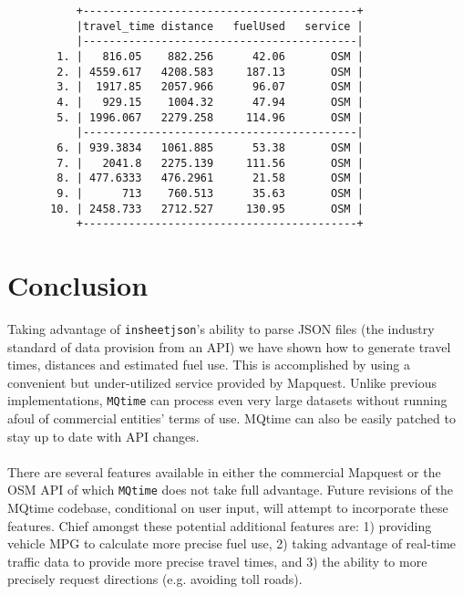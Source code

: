 \documentclass[12pt]{article}
\begin{document}
\begin{figure}[ht]
\begin{center}
{\footnotesize
\begin{verbatim}
     +------------------------------------------+
     |travel_time distance   fuelUsed   service |
     |------------------------------------------|
  1. |   816.05    882.256      42.06       OSM |
  2. | 4559.617   4208.583     187.13       OSM |
  3. |  1917.85   2057.966      96.07       OSM |
  4. |   929.15    1004.32      47.94       OSM |
  5. | 1996.067   2279.258     114.96       OSM |
     |------------------------------------------|
  6. | 939.3834   1061.885      53.38       OSM |
  7. |   2041.8   2275.139     111.56       OSM |
  8. | 477.6333   476.2961      21.58       OSM |
  9. |      713    760.513      35.63       OSM |
 10. | 2458.733   2712.527     130.95       OSM |
     +------------------------------------------+
\end{verbatim}
}
\end{center}
\end{figure}

\section{Conclusion}
Taking advantage of \verb|insheetjson|'s ability to parse JSON files (the industry standard of data provision from an API) we have shown how to generate travel times, distances and estimated fuel use. This is accomplished by using a convenient but under-utilized service provided by Mapquest. Unlike previous implementations, \verb|MQtime| can process even very large datasets without running afoul of commercial entities' terms of use. MQtime can also be easily patched to stay up to date with API changes. 
\\ \\
There are several features available in either the commercial Mapquest or the OSM API of which \verb|MQtime| does not take full advantage. Future revisions of the MQtime codebase, conditional on user input, will attempt to incorporate these features. Chief amongst these potential additional features are: 1) providing vehicle MPG to calculate more precise fuel use, 2) taking advantage of real-time traffic data to provide more precise travel times, and 3) the ability to more precisely request directions (e.g. avoiding toll roads).



\nocite{Ozimek2011, Traveltime3, MapquestTOU, OSMTOU}
\end{document}
